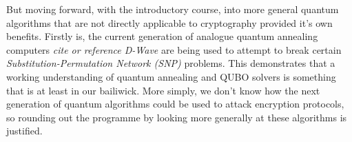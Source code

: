 But moving forward, with the introductory course, into more general quantum algorithms that are not directly applicable to cryptography
provided it's own benefits.
Firstly is, the current generation of analogue quantum annealing computers \emph{cite or reference D-Wave} are being used to attempt
to break certain \emph{Substitution-Permutation Network (SNP)} problems.
This demonstrates that a working understanding of quantum annealing and QUBO solvers is something that is at least in our bailiwick.
More simply, we don't know how the next generation of quantum algorithms could be used to attack encryption protocols, 
so rounding out the programme by looking more generally at these algorithms is justified. 